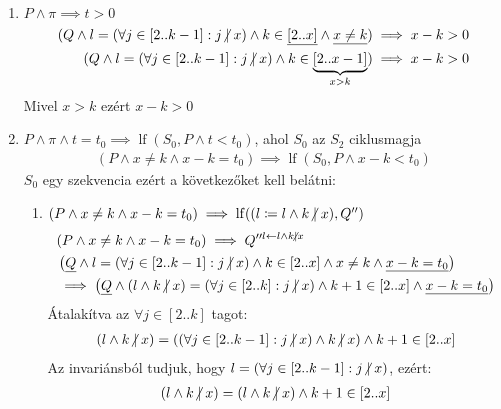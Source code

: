 \documentclass[a4paper,12pt]{article}
\theoremstyle{definition}
\DeclareMathOperator{\lf}{lf}
\begin{document}
\begin{solution}
\begin{enumerate}
\begin{enumerate}
				\item $ P \land \pi \implies t > 0 $
				\begin{align*}
					( Q \land l = \left( \forall j \in \left[ 2..k-1\right]: j \centernot{|} x \right) \land k \in \underline{\left[ 2..x \right]} \land \underline{x \ne k} ) &\implies x-k > 0 \\
					( Q \land l = \left( \forall j \in \left[ 2..k-1\right]: j \centernot{|} x \right) \land k \in \underbrace{\left[ 2..x-1 \right]}_{x>k} ) &\implies x-k > 0
				\end{align*}
				Mivel $x > k$ ezért $x - k > 0$
				\item $ P \land \pi \land t = t_0 \implies \lf{(S_0, P \land t < t_0)} $, ahol $S_0$ az $S_2$ ciklusmagja
				\begin{align*}
					(P \land x \ne k \land x - k = t_0) \implies \lf{(S_0, P \land x-k < t_0)}
				\end{align*}
				$S_0$ egy szekvencia ezért a következőket kell belátni:
				\begin{enumerate}
					\item $ (P \land x \ne k \land x - k = t_0) \implies \lf((l \coloneq l \land k \centernot{|} x), Q'') $
					\begin{align*}
						&(P \land x \ne k \land x - k = t_0) \implies Q''^{l \leftarrow l \land k \centernot{|} x} \\
						&\left( \underline{Q} \land l = \left( \forall j \in \left[ 2..k-1\right]: j \centernot{|} x \right) \land k \in \left[ 2..x \right]   \land x \ne k \land \underline{x - k = t_0} \right) \\
						&\implies \left( \underline{Q} \land (l \land k \centernot{|} x) = \left( \forall j \in \left[ 2..k\right]: j \centernot{|} x  \right) \land k+1 \in \left[ 2..x \right] \land \underline{x-k=t_0} \right)
					\end{align*}
					Átalakítva az $\forall j \in \left[ 2..k\right]$ tagot:					
					\begin{align*}
						(l \land k \centernot{|} x) = \left( (\forall j \in \left[ 2..k-1\right]: j \centernot{|} x) \land k \centernot{|} x  \right) \land k+1 \in \left[ 2..x \right]
					\end{align*}
					Az invariánsból tudjuk, hogy $ l = \left( \forall j \in \left[ 2..k-1\right]: j \centernot{|} x \right) $, ezért:
					\begin{align*}
						(l \land k \centernot{|} x) = \left( l \land k \centernot{|} x  \right) \land k+1 \in \left[ 2..x \right]
					\end{align*}

\end{enumerate}
\end{enumerate}
\end{enumerate}
\end{solution}
\end{document}
